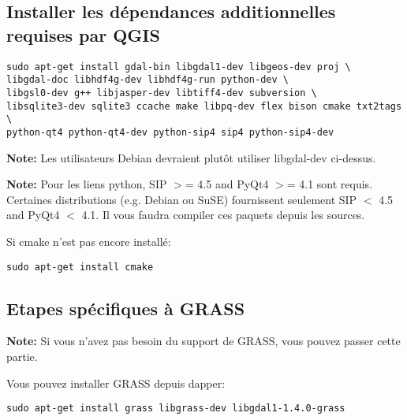 \subsection{Installer les d\'ependances additionnelles requises par QGIS}
\begin{verbatim}
sudo apt-get install gdal-bin libgdal1-dev libgeos-dev proj \
libgdal-doc libhdf4g-dev libhdf4g-run python-dev \
libgsl0-dev g++ libjasper-dev libtiff4-dev subversion \
libsqlite3-dev sqlite3 ccache make libpq-dev flex bison cmake txt2tags \
python-qt4 python-qt4-dev python-sip4 sip4 python-sip4-dev
\end{verbatim}

\textbf{Note:} Les utilisateurs Debian devraient plut\^ot utiliser libgdal-dev ci-dessus.

\textbf{Note:} Pour les liens python, SIP $>$= 4.5 and PyQt4 $>$= 4.1 sont requis. Certaines distributions (e.g. Debian ou SuSE) fournissent seulement SIP $<$ 4.5 and PyQt4 $<$ 4.1. Il vous faudra compiler ces paquets depuis les sources.

Si cmake n'est pas encore install\'e:

\begin{verbatim}
sudo apt-get install cmake
\end{verbatim}

% 
% 
% 

\subsection{Etapes sp\'ecifiques \`a GRASS}
\textbf{Note:} Si vous n'avez pas besoin du support de GRASS, vous pouvez passer cette partie.

Vous pouvez installer GRASS depuis dapper:

\begin{verbatim}
sudo apt-get install grass libgrass-dev libgdal1-1.4.0-grass 
\end{verbatim}

